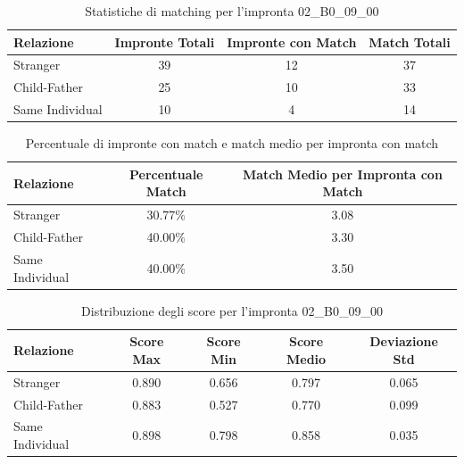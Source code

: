 \begin{table}[htbp]
\centering
\caption{Statistiche di matching per l'impronta 02\_B0\_09\_00}
\label{tab:results_02_B0_09_00}
\begin{tabular}{|l|c|c|c|}
\hline
\textbf{Relazione} & \textbf{Impronte Totali} & \textbf{Impronte con Match} & \textbf{Match Totali} \\
\hline
Stranger & 39 & 12 & 37 \\
\hline
Child-Father & 25 & 10 & 33 \\
\hline
Same Individual & 10 & 4 & 14 \\
\hline
\end{tabular}
\end{table}


\begin{table}[htbp]
\centering
\caption{Percentuale di impronte con match e match medio per impronta con match}
\label{tab:match_percentage_02_B0_09_00}
\begin{tabular}{|l|c|c|}
\hline
\textbf{Relazione} & \textbf{Percentuale Match} & \textbf{Match Medio per Impronta con Match} \\
\hline
Stranger & 30.77\% & 3.08 \\
\hline
Child-Father & 40.00\% & 3.30 \\
\hline
Same Individual & 40.00\% & 3.50 \\
\hline
\end{tabular}
\end{table}


\begin{table}[htbp]
\centering
\caption{Distribuzione degli score per l'impronta 02\_B0\_09\_00}
\label{tab:scores_02_B0_09_00}
\begin{tabular}{|l|c|c|c|c|}
\hline
\textbf{Relazione} & \textbf{Score Max} & \textbf{Score Min} & \textbf{Score Medio} & \textbf{Deviazione Std} \\
\hline
Stranger & 0.890 & 0.656 & 0.797 & 0.065 \\
\hline
Child-Father & 0.883 & 0.527 & 0.770 & 0.099 \\
\hline
Same Individual & 0.898 & 0.798 & 0.858 & 0.035 \\
\hline
\end{tabular}
\end{table}

